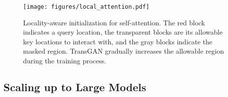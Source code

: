 \documentclass{article}
\begin{document}
\begin{figure}[t]
\begin{center}
\vspace{-0.5em}
\texttt{[image: figures/local\_attention.pdf]}
\end{center}
\vspace{-1em}
\caption{Locality-aware initialization for self-attention. The red block indicates a query location, the transparent blocks are its allowable key locations to interact with, and the gray blocks indicate the masked region. TransGAN gradually increases the allowable region during the training process.}
\vspace{-0.5em}
\label{fig:local_attention}
\end{figure}








\begin{table}[h]
\vspace{-0.5em}
\caption{Scaling-up the model size of TransGAN on CIFAR-10. Here ``Dim" represents the embedded dimension of transformer and ``Depth" is the number of transformer encoder block in each stage.}
\label{table:scaling}
\begin{center}
\begin{small}
\begin{sc}
\end{sc}
\end{small}
\end{center}
\vspace{-0.5em}
\end{table}


\subsection{Scaling up to Large Models}
\end{document}
